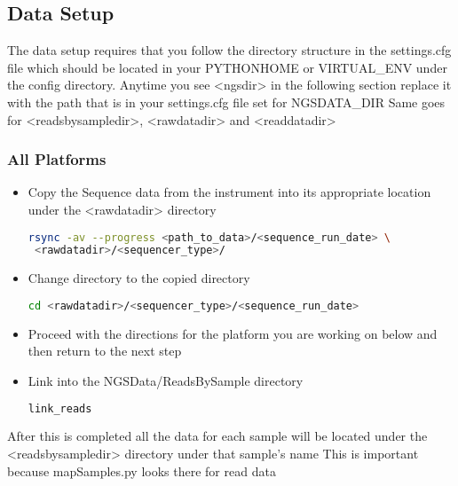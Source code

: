 \documentclass{article}
\begin{document}
\subsection{Data Setup}

The data setup requires that you follow the directory structure in the settings.cfg file which should be located in your PYTHONHOME or VIRTUAL\_ENV under the config directory.
Anytime you see <ngsdir> in the following section replace it with the path that is in your settings.cfg file set for NGSDATA\_DIR
Same goes for <readsbysampledir>, <rawdatadir> and <readdatadir>

\subsubsection{All Platforms}
\begin{itemize}
\item Copy the Sequence data from the instrument into its appropriate location under the <rawdatadir> directory
\begin{lstlisting}[language=bash]
rsync -av --progress <path_to_data>/<sequence_run_date> \
 <rawdatadir>/<sequencer_type>/
\end{lstlisting}

\item Change directory to the copied directory
{\tiny
\begin{lstlisting}[language=bash]
cd <rawdatadir>/<sequencer_type>/<sequence_run_date>
\end{lstlisting}
}

\item Proceed with the directions for the platform you are working on below and then return to the next step

\item Link into the NGSData/ReadsBySample directory
{\tiny
\begin{lstlisting}[language=bash]
link_reads
\end{lstlisting}
}
\end{itemize}

After this is completed all the data for each sample will be located under the <readsbysampledir> directory under that sample's name
This is important because mapSamples.py looks there for read data
\end{document}
